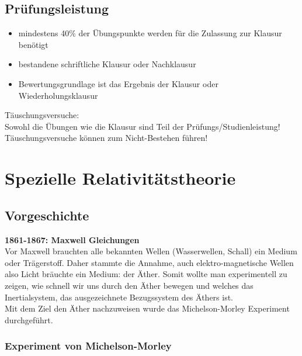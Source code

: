 \documentclass[titlepage,11pt,a4paper,ngerman]{report}
\begin{document}
\section{Prüfungsleistung}
\begin{itemize}
	\item mindestens 40\% der Übungspunkte werden für die Zulassung zur Klausur benötigt
	\item bestandene schriftliche Klausur oder Nachklausur
	\item Bewertungsgrundlage ist das Ergebnis der Klausur oder Wiederholungsklausur
\end{itemize}
Täuschungsversuche:\\
Sowohl die Übungen wie die Klausur sind Teil der Prüfungs/Studienleistung! Täuschungsversuche können zum Nicht-Bestehen führen!


\renewcommand{\thechapter}{\Roman{chapter}}
\chapter{Spezielle Relativitätstheorie}

\section{Vorgeschichte}

\textbf{1861-1867: Maxwell Gleichungen}\\
Vor Maxwell brauchten alle bekannten Wellen (Wasserwellen, Schall) ein Medium oder Trägerstoff. Daher stammte die Annahme, auch elektro-magnetische Wellen also Licht bräuchte ein Medium: der Äther. Somit wollte man experimentell zu zeigen, wie schnell wir uns durch den Äther bewegen und welches das Inertialsystem, das ausgezeichnete Bezugssystem des Äthers ist.\\
Mit dem Ziel den Äther nachzuweisen wurde das Michelson-Morley Experiment durchgeführt.

\subsection{Experiment von Michelson-Morley}%
\end{document}
